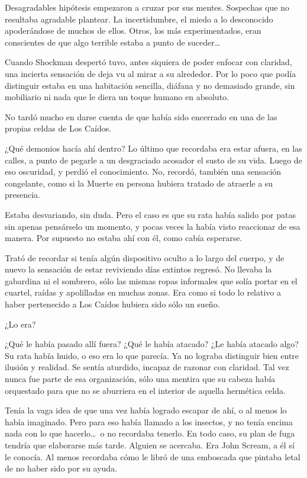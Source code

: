 Desagradables hipótesis empezaron a cruzar por sus mentes. Sospechas que no resultaba agradable plantear. La incertidumbre, el miedo a lo desconocido apoderándose de muchos de ellos.
Otros, los más experimentados, eran conscientes de que algo terrible estaba a punto de suceder\dots

\fancyparbreak
Cuando Shockman despertó tuvo, antes siquiera de poder enfocar con claridad, una incierta sensación de deja vu al mirar a su alrededor. Por lo poco que podía distinguir estaba en una habitación sencilla, diáfana y no demasiado grande, sin mobiliario ni nada que le diera un toque humano en absoluto.

No tardó mucho en darse cuenta de que había sido encerrado en una de las propias celdas de Los Caídos.

¿Qué demonios hacía ahí dentro? Lo último que recordaba era estar afuera, en las calles, a punto de pegarle a un desgraciado acosador el susto de su vida. Luego de eso oscuridad, y perdió el conocimiento. No, recordó, también una sensación congelante, como si la Muerte en persona hubiera tratado de atraerle a su presencia.

Estaba desvariando, sin duda. Pero el caso es que su rata había salido por patas sin apenas pensárselo un momento, y pocas veces la había visto reaccionar de esa manera. Por supuesto no estaba ahí con él, como cabía esperarse.

Trató de recordar si tenía algún dispositivo oculto a lo largo del cuerpo, y de nuevo la sensación de estar reviviendo días extintos regresó. No llevaba la gabardina ni el sombrero, sólo las mismas ropas informales que solía portar en el cuartel, raídas y apolilladas en muchas zonas. Era como si todo lo relativo a haber pertenecido a Los Caídos hubiera sido sólo un sueño.

¿Lo era?

¿Qué le había pasado allí fuera? ¿Qué le había atacado? ¿Le había atacado algo? Su rata había huido, o eso era lo que parecía. Ya no lograba distinguir bien entre ilusión y realidad. Se sentía aturdido, incapaz de razonar con claridad. Tal vez nunca fue parte de esa organización, sólo una mentira que su cabeza había orquestado para que no se aburriera en el interior de aquella hermética celda.

Tenía la vaga idea de que una vez había logrado escapar de ahí, o al menos lo había imaginado. Pero para eso había llamado a los insectos, y no tenía encima nada con lo que hacerlo\dots\ o no recordaba tenerlo. En todo caso, su plan de fuga tendría que elaborarse más tarde. Alguien se acercaba. Era John Scream, a él sí le conocía. Al menos recordaba cómo le libró de una emboscada que pintaba letal de no haber sido por su ayuda.

